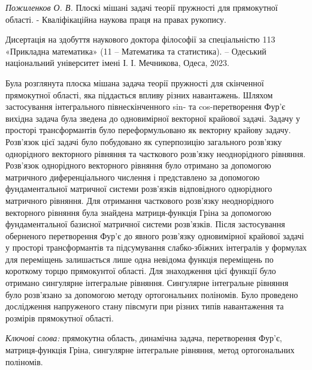 \textit{Пожиленков О. В.}
Плоскі мішані задачі теорії пружності для прямокутної області. - Кваліфікаційна наукова праця на правах рукопису.

Дисертація на здобуття наукового доктора філософії за спеціальністю 113 «Прикладна математика» (11 – Математика та статистика). – Одеський національний університет імені І. І. Мечникова, Одеса, 2023.

Була розглянута плоска мішана задача теорії пружності для скінченної прямокутної області, яка піддається впливу різних навантажень.
Шляхом застосування інтегрального півнескінченного sin- та cos-перетворення Фур'є вихідна задача була зведена до одновимірної векторної крайової задачі.
Задачу у просторі трансформантів було переформульовано як векторну крайову задачу.
Розв'язок цієї задачі було побудовано як суперпозицію загального розв'язку однорідного векторного рівняння та часткового розв'язку неоднорідного рівняння.
Розв'язок однорідного векторного рівняння було отримано за допомогою матричного диференціального числення і представлено за допомогою фундаментальної матричної системи розв'язків відповідного однорідного матричного рівняння.
Для отримання часткового розв'язку неоднорідного векторного рівняння була знайдена матриця-функція Гріна за допомогою фундаментальної базисної матричної системи розв'язків.
Після застосування оберненого перетворення Фур'є до явного розв'язку одновимірної крайової задачі у просторі трансформантів та підсумування слабко-збіжних інтегралів у формулах для переміщень залишається лише одна невідома функція переміщень по короткому торцю прямокунтої області.
Для знаходження цієї функції було отримано сингулярне інтегральне рівняння.
Сингулярне інтегральне рівняння було розв'язано за допомогою методу ортогональних поліномів.
Було проведено дослідження напруженого стану півсмуги при різних типів навантаження та розмірів прямокутної області.

\textit{Ключові слова:}
прямокутна область, динамічна задача, перетворення Фур’є, матриця-функція Гріна, сингулярне інтегральне рівняння, метод ортогональних поліномів.
